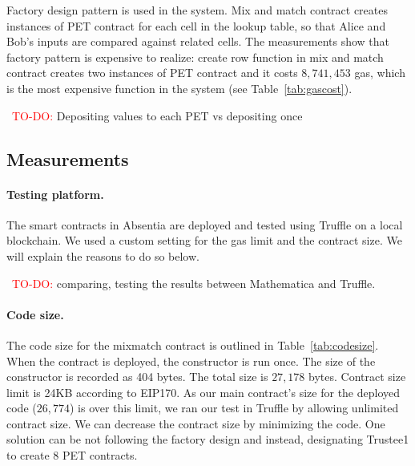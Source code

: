 Factory design pattern is used in the system. Mix and match contract creates instances of PET contract for each cell in the lookup table, so that Alice and Bob's inputs are compared against related cells. The measurements show that factory pattern is expensive to realize: create row function in mix and match contract creates two instances of PET contract and it costs $8,741,453$ gas, which is the most expensive function in the system (see Table~\ref{tab:gascost}).


~\textcolor{red}{TO-DO:}
Depositing values to each PET vs depositing once


\subsection{Measurements}


\paragraph{Testing platform.} 
The smart contracts in Absentia are deployed and tested using Truffle on a local blockchain. We used a custom setting for the gas limit and the contract size. We will explain the reasons to do so below.

~\textcolor{red}{TO-DO:} comparing, testing the results between Mathematica and Truffle.




\paragraph{Code size.} 

The code size for the mixmatch contract is outlined in Table~\ref{tab:codesize}.  When the contract is deployed, the constructor is run once. The size of the constructor is recorded as 404 bytes. The total size is $27,178$ bytes. Contract size limit is 24KB according to EIP170. As our main contract's size for the deployed code ($26,774$) is over this limit, we ran our test in Truffle by allowing unlimited contract size. We can decrease the contract size by minimizing the code. One solution can be not following the factory design and instead, designating Trustee1 to create 8 PET contracts.


